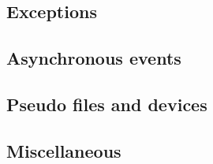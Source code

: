 \subsection{Exceptions}





\subsection{Asynchronous events}




\subsection{Pseudo files and devices}




\subsection{Miscellaneous}
